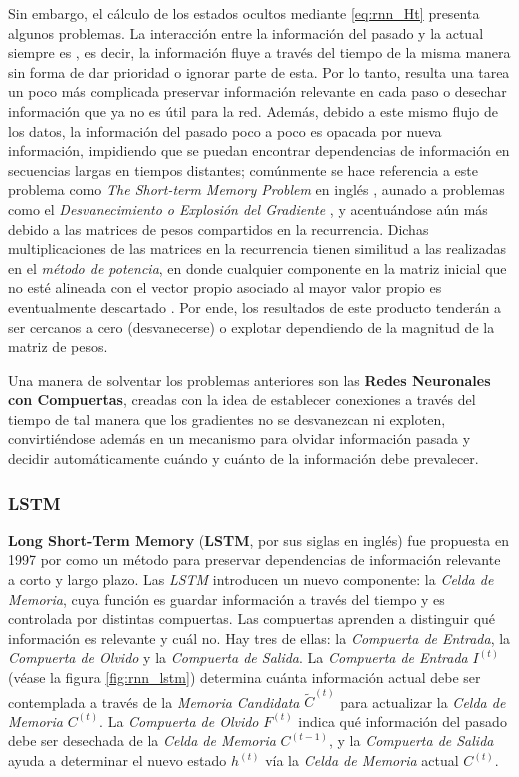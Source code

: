 Sin embargo, el cálculo de los estados ocultos mediante \ref{eq:rnn_Ht} presenta algunos problemas.
La interacción entre la información del pasado y la actual siempre es , es decir, la información
fluye a través del tiempo de la misma manera sin forma de dar prioridad o ignorar parte de
esta. Por lo tanto, resulta una tarea un poco más complicada preservar información relevante en cada paso
o desechar información que ya no es útil para la red. Además, debido a este mismo flujo de los
datos, la información del pasado poco a poco es opacada por nueva información, impidiendo que se
puedan encontrar dependencias de información en secuencias largas en tiempos distantes;
comúnmente se hace referencia a este problema como \textit{The Short-term Memory Problem} en inglés
\cite{VanishinGradient2}, aunado a problemas como el
\textit{Desvanecimiento o Explosión del Gradiente} \cite{VanishinGradient} \cite{pmlr-v28-pascanu13},
y acentuándose aún más
debido a las matrices de pesos compartidos en la recurrencia. Dichas
multiplicaciones de las matrices en la recurrencia tienen similitud a las realizadas en el
\textit{método de potencia}, en donde cualquier
componente en la matriz inicial que no esté alineada con el vector propio asociado al mayor valor
propio es eventualmente descartado \cite[pp.~390-392]{GoodBengCour16}. Por ende, los resultados
de este producto tenderán a ser cercanos a cero (desvanecerse) o explotar dependiendo de la magnitud
de la matriz de pesos.


Una manera de solventar los problemas anteriores son las \textbf{Redes Neuronales con Compuertas},
creadas con la idea de establecer conexiones a través del tiempo de tal manera que los gradientes no
se desvanezcan ni exploten, convirtiéndose además en un mecanismo para olvidar información pasada y
decidir automáticamente cuándo y cuánto de la información debe prevalecer.


\subsubsection{LSTM}

\textbf{Long Short-Term Memory} (\textbf{LSTM}, por sus siglas en inglés) fue propuesta en 1997 por
\citeauthor{LSTM} como un método para preservar dependencias de información relevante
a corto y largo plazo. Las \textit{LSTM} introducen un nuevo componente: la
\textit{Celda de Memoria}, cuya función es guardar información a través del tiempo y es
controlada por distintas compuertas. Las compuertas aprenden a distinguir qué información es relevante y
cuál no. Hay tres de ellas: la \textit{Compuerta de Entrada}, la \textit{Compuerta de Olvido}
y la \textit{Compuerta de Salida}. La \textit{Compuerta de Entrada} $I^{(t)}$ (véase la figura
\ref{fig:rnn_lstm}) determina cuánta información actual debe ser contemplada a través de la
\textit{Memoria Candidata} $\tilde{C}^{(t)}$ para actualizar la \textit{Celda de Memoria} $C^{(t)}$.
La \textit{Compuerta de Olvido} $F^{(t)}$ indica qué información del pasado debe ser desechada de la
\textit{Celda de Memoria} $C^{(t-1)}$, y la \textit{Compuerta de Salida} ayuda a determinar el nuevo
estado $h^{(t)}$ vía la \textit{Celda de Memoria} actual $C^{(t)}$.


